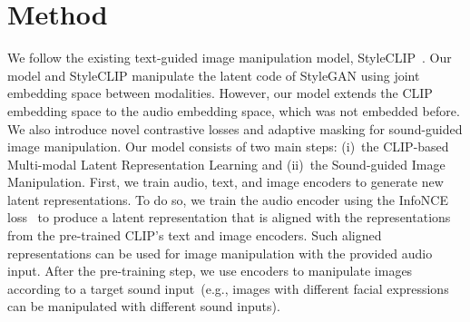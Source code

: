 \documentclass[10pt,twocolumn,letterpaper]{article}
\def\authornote#1#2#3{{\textcolor{#2}{\textsl{\small[#1: #3]}}}}
\newcommand{\wonmin}[1]{\authornote{Wonmin}{Blue}{#1}} %
\begin{document}
\section{Method}
We follow the existing text-guided image manipulation model, StyleCLIP~\cite{Patashnik_2021_ICCV}. Our model and StyleCLIP manipulate the latent code of StyleGAN using joint embedding space between modalities. However, our model extends the CLIP~\cite{radford2learning} embedding space to the audio embedding space, which was not embedded before. We also introduce novel contrastive losses and adaptive masking for sound-guided image manipulation.
Our model consists of two main steps: (i)~the CLIP-based Multi-modal Latent Representation Learning and (ii)~the Sound-guided Image Manipulation. First, we train audio, text, and image encoders to generate new latent representations. To do so, we train the audio encoder using the InfoNCE loss~\cite{oord2018representation, alayrac2020self, zhang2020contrastive} to produce a latent representation that is aligned with the representations from the pre-trained CLIP's text and image encoders. Such aligned representations can be used for image manipulation with the provided audio input. After the pre-training step, we use encoders to manipulate images according to a target sound input~(e.g., images with different facial expressions can be manipulated with different sound inputs).
\end{document}
